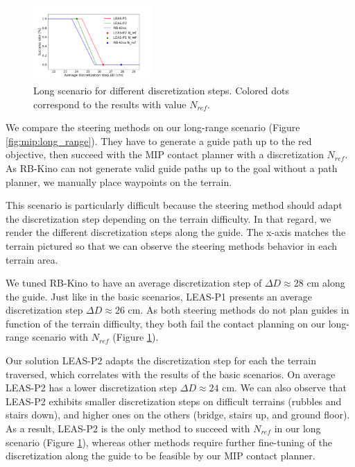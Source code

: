 \begin{figure}[ht]
    \centering
    \includegraphics[trim={0cm 0cm 2cm 1.7cm}, clip,width=0.4\textwidth, height=3cm]{Figures/Chapter_MIP_SL1M/res_mip/MIP_res_long/FIGURE_MIP_LONG_2.png}
    \caption{Long scenario for different discretization steps. Colored dots correspond to the results with value $N_{ref}$.}
    \label{fig:mip:long_range:res}
\end{figure}

We compare the steering methods on our long-range scenario (Figure \ref{fig:mip:long_range}).
They have to generate a guide path up to the red objective, then succeed with the MIP contact planner with a discretization $N_{ref}$.
As RB-Kino can not generate valid guide paths up to the goal without a path planner, we manually place waypoints on the terrain.

This scenario is particularly difficult because the steering method should adapt the discretization step depending on the terrain difficulty.
In that regard, we render the different discretization steps along the guide.
The x-axis matches the terrain pictured so that we can observe the steering methods behavior in each terrain area.

We tuned RB-Kino to have an average discretization step of $\Delta D \approx 28$ cm along the guide.
Just like in the basic scenarios, LEAS-P1 presents an average discretization step $\Delta D \approx 26$ cm.
As both steering methods do not plan guides in function of the terrain difficulty, they both fail the contact planning on our long-range scenario with $N_{ref}$ (Figure \ref{fig:mip:long_range:res}).

Our solution LEAS-P2 adapts the discretization step for each the terrain traversed, which correlates with the results of the basic scenarios. 
On average LEAS-P2 has a lower discretization step $\Delta D \approx 24$ cm.
We can also observe that LEAS-P2 exhibits smaller discretization steps on difficult terrains (rubbles and stairs down), and higher ones on the others (bridge, stairs up, and ground floor).
As a result, LEAS-P2 is the only method to succeed with $N_{ref}$ in our long scenario (Figure \ref{fig:mip:long_range:res}), whereas other methods require further fine-tuning of the discretization along the guide to be feasible by our MIP contact planner.



